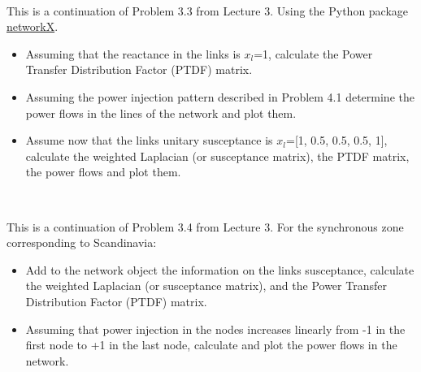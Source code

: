 \documentclass[10pt]{article}
\newenvironment{problem}[2][Problem]{\begin{trivlist}
\item[\hskip \labelsep {\bfseries #1}\hskip \labelsep {\bfseries #2.}]}{\end{trivlist}}
\begin{document}
\


\begin{problem}{4.3}
This is a continuation of Problem 3.3 from Lecture 3.
Using the Python package \href{https://networkx.org/}{networkX}.

\begin{itemize}
\item[a)] Assuming that the reactance in the links is $x_l$=1, calculate the Power Transfer Distribution Factor (PTDF) matrix.

\item[b)] Assuming the power injection pattern described in Problem 4.1 determine the power flows in the lines of the network and plot them.

\item[c)] Assume now that the links unitary susceptance is $x_{l}$=[1, 0.5, 0.5, 0.5, 1], calculate the weighted Laplacian (or susceptance matrix),  the PTDF matrix, the power flows and plot them. 

\end{itemize}

\end{problem}

\

\begin{problem}{4.4}
This is a continuation of Problem 3.4 from Lecture 3. For the synchronous zone corresponding to Scandinavia:

\begin{itemize}
\item[a)] Add to the network object the information on the links susceptance, calculate the weighted Laplacian (or susceptance matrix), and the Power Transfer Distribution Factor (PTDF) matrix.

\item[b)] Assuming that power injection in the nodes increases linearly from -1 in the first node to +1 in the last node, calculate and plot the power flows in the network.

\end{itemize}

\end{problem}

\end{document}
